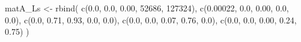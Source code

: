 \documentclass[
  12pt,
  letterpaper,
]{book}
\newenvironment{Shaded}{\begin{snugshade}}{\end{snugshade}}
\newcommand{\DecValTok}[1]{\textcolor[rgb]{0.68,0.00,0.00}{#1}}
\newcommand{\FloatTok}[1]{\textcolor[rgb]{0.68,0.00,0.00}{#1}}
\newcommand{\FunctionTok}[1]{\textcolor[rgb]{0.28,0.35,0.67}{#1}}
\newcommand{\NormalTok}[1]{\textcolor[rgb]{0.00,0.23,0.31}{#1}}
\newcommand{\OtherTok}[1]{\textcolor[rgb]{0.00,0.23,0.31}{#1}}
\begin{document}
\begin{Shaded}
\begin{Highlighting}[]
\NormalTok{matA\_Ls }\OtherTok{\textless{}{-}} \FunctionTok{rbind}\NormalTok{(}
  \FunctionTok{c}\NormalTok{(}\FloatTok{0.0}\NormalTok{, }\FloatTok{0.0}\NormalTok{, }\FloatTok{0.00}\NormalTok{, }\DecValTok{52686}\NormalTok{, }\DecValTok{127324}\NormalTok{),}
  \FunctionTok{c}\NormalTok{(}\FloatTok{0.00022}\NormalTok{, }\FloatTok{0.0}\NormalTok{, }\FloatTok{0.00}\NormalTok{, }\FloatTok{0.0}\NormalTok{, }\FloatTok{0.0}\NormalTok{),}
  \FunctionTok{c}\NormalTok{(}\FloatTok{0.0}\NormalTok{, }\FloatTok{0.71}\NormalTok{, }\FloatTok{0.93}\NormalTok{, }\FloatTok{0.0}\NormalTok{, }\FloatTok{0.0}\NormalTok{),}
  \FunctionTok{c}\NormalTok{(}\FloatTok{0.0}\NormalTok{, }\FloatTok{0.0}\NormalTok{, }\FloatTok{0.07}\NormalTok{, }\FloatTok{0.76}\NormalTok{, }\FloatTok{0.0}\NormalTok{),}
  \FunctionTok{c}\NormalTok{(}\FloatTok{0.0}\NormalTok{, }\FloatTok{0.0}\NormalTok{, }\FloatTok{0.00}\NormalTok{, }\FloatTok{0.24}\NormalTok{, }\FloatTok{0.75}\NormalTok{)}
\NormalTok{)}



\end{Highlighting}
\end{Shaded}
\end{document}
